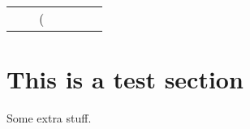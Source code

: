 \documentclass[11pt]{article}
\begin{document}
\begin{center}
\begin{tabular}{lllllll}
{{book & \documentclass[11pt]{book} & (\part{%
\end{tabular}
\end{center}

\section{This is a test section}
\label{sec:org2e2eef9}

Some extra stuff.
\end{document}
